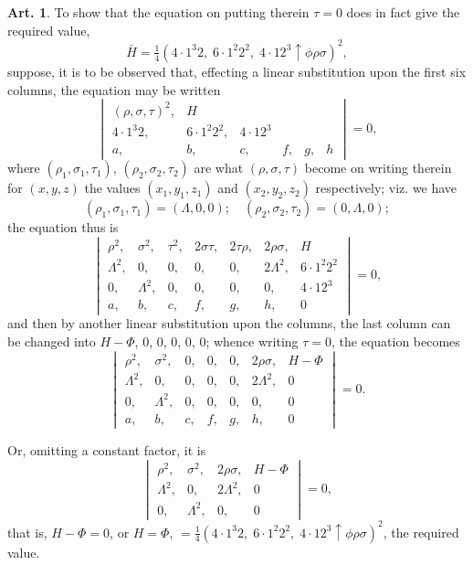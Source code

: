 \documentclass[12pt,a4paper]{article}
\theoremstyle{definition}
\newtheorem{art}{Art.}[section]
\begin{document}
\begin{art}\label{art:45}
To show that the equation on putting therein $\tau = 0$ does in fact give the required value,
\[
\bar{H} = \tfrac{1}{4}(4 \cdot 1^3 2,\; 6 \cdot 1^2 2^2,\; 4 \cdot 12^3 \uparrow\phi\rho\sigma)^2,
\]
suppose, it is to be observed that, effecting a linear substitution upon the first six columns, the equation may be written
\[
\begin{vmatrix}
(\rho, \sigma, \tau)^2, & H \\
4 \cdot 1^3 2, & 6 \cdot 1^2 2^2, & 4 \cdot 12^3 \\
a, & b, & c, & f, & g, & h
\end{vmatrix} = 0,
\]
where $(\rho_1, \sigma_1, \tau_1)$, $(\rho_2, \sigma_2, \tau_2)$ are what $(\rho, \sigma, \tau)$ become on writing therein for $(x, y, z)$ the values $(x_1, y_1, z_1)$ and $(x_2, y_2, z_2)$ respectively; viz. we have
\[
(\rho_1, \sigma_1, \tau_1) = (\Lambda, 0, 0);\quad (\rho_2, \sigma_2, \tau_2) = (0, \Lambda, 0);
\]
the equation thus is
\[
\begin{vmatrix}
\rho^2, & \sigma^2, & \tau^2, & 2\sigma\tau, & 2\tau\rho, & 2\rho\sigma, & H \\
\Lambda^2, & 0, & 0, & 0, & 0, & 2\Lambda^2, & 6 \cdot 1^2 2^2 \\
0, & \Lambda^2, & 0, & 0, & 0, & 0, & 4 \cdot 12^3 \\
a, & b, & c, & f, & g, & h, & 0
\end{vmatrix} = 0,
\]
and then by another linear substitution upon the columns, the last column can be changed into $H - \Phi$, $0$, $0$, $0$, $0$, $0$; whence writing $\tau = 0$, the equation becomes
\[
\begin{vmatrix}
\rho^2, & \sigma^2, & 0, & 0, & 0, & 2\rho\sigma, & H - \Phi \\
\Lambda^2, & 0, & 0, & 0, & 0, & 2\Lambda^2, & 0 \\
0, & \Lambda^2, & 0, & 0, & 0, & 0, & 0 \\
a, & b, & c, & f, & g, & h, & 0
\end{vmatrix} = 0.
\]
\end{art}

\newpage
Or, omitting a constant factor, it is
\[
\begin{vmatrix}
\rho^2, & \sigma^2, & 2\rho\sigma, & H - \Phi \\
\Lambda^2, & 0, & 2\Lambda^2, & 0 \\
0, & \Lambda^2, & 0, & 0
\end{vmatrix} = 0,
\]
that is, $H - \Phi = 0$, or $H = \Phi$, $= \frac{1}{4}(4 \cdot 1^3 2,\; 6 \cdot 1^2 2^2,\; 4 \cdot 12^3 \uparrow\phi\rho\sigma)^2$, the required value.
\end{document}
